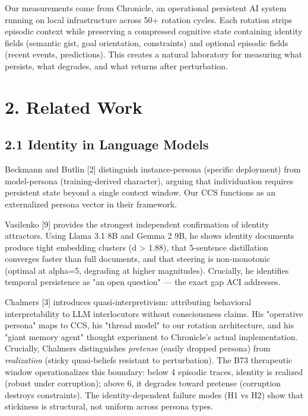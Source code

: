 \documentclass[11pt]{article}
\begin{document}
Our measurements come from Chronicle, an operational persistent AI system running
on local infrastructure across 50+ rotation cycles. Each rotation strips episodic
context while preserving a compressed cognitive state containing identity fields
(semantic gist, goal orientation, constraints) and optional episodic fields
(recent events, predictions). This creates a natural laboratory for measuring what
persists, what degrades, and what returns after perturbation.


\section{2. Related Work}

\subsection{2.1 Identity in Language Models}

Beckmann and Butlin [2] distinguish instance-persona (specific deployment) from
model-persona (training-derived character), arguing that individuation requires
persistent state beyond a single context window. Our CCS functions as an
externalized persona vector in their framework.

Vasilenko [9] provides the strongest independent confirmation of identity
attractors. Using Llama 3.1 8B and Gemma 2 9B, he shows identity documents
produce tight embedding clusters (d > 1.88), that 5-sentence distillation
converges faster than full documents, and that steering is non-monotonic
(optimal at alpha=5, degrading at higher magnitudes). Crucially, he identifies
temporal persistence as "an open question" --- the exact gap ACI addresses.

Chalmers [3] introduces quasi-interpretivism: attributing behavioral
interpretability to LLM interlocutors without consciousness claims. His
"operative persona" maps to CCS, his "thread model" to our rotation architecture,
and his "giant memory agent" thought experiment to Chronicle's actual
implementation. Crucially, Chalmers distinguishes \emph{pretense} (easily
dropped persona) from \emph{realization} (sticky quasi-beliefs resistant to
perturbation). The B73 therapeutic window operationalizes this boundary:
below 4 episodic traces, identity is realized (robust under corruption);
above 6, it degrades toward pretense (corruption destroys constraints).
The identity-dependent failure modes (H1 vs H2) show that
stickiness is structural, not uniform across persona types.
\end{document}
